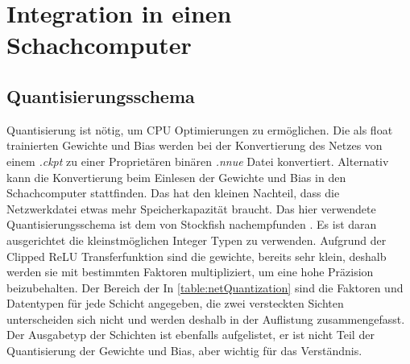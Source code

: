 


\section{Integration in einen Schachcomputer}

\subsection{Quantisierungsschema}

Quantisierung ist nötig, um CPU Optimierungen zu ermöglichen. Die als float trainierten Gewichte und Bias werden bei der Konvertierung des Netzes von einem \emph{.ckpt} zu einer Proprietären binären \emph{.nnue} Datei konvertiert. Alternativ kann die Konvertierung beim Einlesen der Gewichte und Bias in den Schachcomputer stattfinden. Das hat den kleinen Nachteil, dass die Netzwerkdatei etwas mehr Speicherkapazität braucht. Das hier verwendete Quantisierungsschema ist dem von Stockfish nachempfunden \cite{StockfishNNUE}. Es ist daran ausgerichtet die kleinstmöglichen Integer Typen zu verwenden. Aufgrund der Clipped \ac{ReLU} Transferfunktion sind die gewichte, bereits sehr klein, deshalb werden sie mit bestimmten Faktoren multipliziert, um eine hohe Präzision beizubehalten. Der Bereich der  In \autoref{table:netQuantization} sind die Faktoren und Datentypen für jede Schicht angegeben, die zwei versteckten Sichten unterscheiden sich nicht und werden deshalb in der Auflistung zusammengefasst. Der Ausgabetyp der Schichten ist ebenfalls aufgelistet, er ist nicht Teil der Quantisierung der Gewichte und Bias, aber wichtig für das Verständnis.


